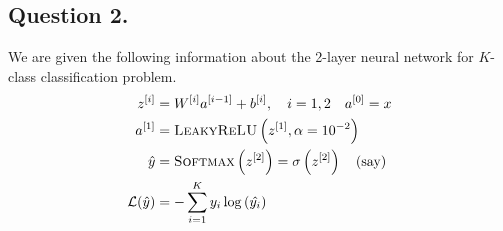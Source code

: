 \documentclass[10pt]{article}
\begin{document}
    \subsection*{\textbf{Question 2.}}
    We are given the following information about the 2-layer neural network for
    $K$-class classification problem.
    \begin{align*}
        z^{[i]} &= W^{[i]} a^{[i-1]} + b^{[i]}, \quad i = 1, 2 \quad a^{[0]} = x \\
        a^{[1]} &= \textsc{LeakyReLU}\left( z^{[1]}, \alpha=10^{-2} \right) \\
        \hat{y} &= \textsc{Softmax}\left( z^{[2]} \right) = \sigma\left( z^{[2]} \right) \quad \text{(say)} \\
        \mathcal{L}(\hat{y}) &= - \sum_{i=1}^{K} y_{i} \log{(\hat{y_{i}})}
    \end{align*}
\end{document}

